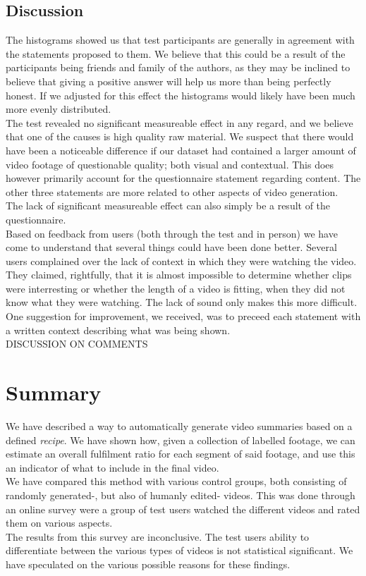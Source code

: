 \subsection{Discussion}
%
The histograms showed us that test participants are generally in agreement with the statements proposed to them. We believe that this could be a result of the participants being friends and family of the authors, as they may be inclined to believe that giving a positive answer will help us more than being perfectly honest. If we adjusted for this effect the histograms would likely have been much more evenly distributed.\\
%
The test revealed no significant measureable effect in any regard, and we believe that one of the causes is high quality raw material. We suspect that there would have been a noticeable difference if our dataset had contained a larger amount of video footage of questionable quality; both visual and contextual. This does however primarily account for the questionnaire statement regarding content. The other three statements are more related to other aspects of video generation.\\
The lack of significant measureable effect can also simply be a result of the questionnaire.
\\
Based on feedback from users (both through the test and in person) we have come to understand that several things could have been done better. Several users complained over the lack of context in which they were watching the video. They claimed, rightfully, that it is almost impossible to determine whether clips were interresting or whether the length of a video is fitting, when they did not know what they were watching. The lack of sound only makes this more difficult. One suggestion for improvement, we received, was to preceed each statement with a written context describing what was being shown.\\
DISCUSSION ON COMMENTS
%
\section{Summary}
%
We have described a way to automatically generate video summaries based on a defined \textit{recipe}. We have shown how, given a collection of labelled footage, we can estimate an overall fulfilment ratio for each segment of said footage, and use this an indicator of what to include in the final video.\\
We have compared this method with various control groups, both consisting of randomly generated-, but also of humanly edited- videos. This was done through an online survey were a group of test users watched the different videos and rated them on various aspects.\\
The results from this survey are inconclusive. The test users ability to differentiate between the various types of videos is not statistical significant. We have speculated on the various possible reasons for these findings.
\\
%

%
